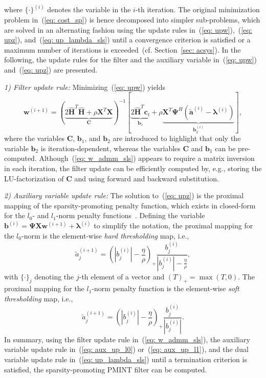 \documentclass{article}
\begin{document}
where $\{\cdot\}^{(i)}$ denotes the variable in the $i$-th iteration.
The original minimization problem in~(\ref{eq: cost_sp}) is hence decomposed into simpler sub-problems, which are solved in an alternating fashion using the update rules in~(\ref{eq: upw}),~(\ref{eq: upz}), and~(\ref{eq: up_lambda_sls}) until a convergence criterion is satisfied or a maximum number of iterations is exceeded~(cf. Section~\ref{sec: acsys}).
In the following, the update rules for the filter and the auxiliary variable in~(\ref{eq: upw}) and~(\ref{eq: upz}) are presented.

{\textit{1) Filter update rule:}} \enspace Minimizing~(\ref{eq: upw}) yields
{\small{\begin{equation}
\label{eq: w_admm_sls}
\!\mathbf{w}^{(i+1)} \!\!=\!\! (\underbrace{2 \hat{\mathbf{H}}^T\hat{\mathbf{H}} \!+\! \rho \mathbf{X}^T \mathbf{X}}_{\mathbf{C}})^{-1} [\underbrace{2 \hat{\mathbf{H}}^T \!\!\mathbf{c}_t}_{\mathbf{b}^{}_1} + \rho \underbrace{\mathbf{X}^T \mathbf{\Psi}^H \!(\tilde{\mathbf{a}}^{(i)} \!\!-\!\! \boldsymbol{\lambda}^{(i)})}_{\mathbf{b}_2^{(i)}}],\!\!\!\!
\end{equation}}}%
where the variables $\mathbf{C}$, $\mathbf{b}_1$, and $\mathbf{b}_2$ are introduced to highlight that only the variable $\mathbf{b}_2$ is iteration-dependent, whereas the variables $\mathbf{C}$ and $\mathbf{b}_1$ can be pre-computed.
Although~(\ref{eq: w_admm_sls}) appears to require a matrix inversion in each iteration, the filter update can be efficiently computed by, e.g., storing the LU-factorization of $\mathbf{C}$ and using forward and backward substitution.

{\textit{2) Auxiliary variable update rule:}} \enspace The solution to~(\ref{eq: upz}) is the proximal mapping of the sparsity-promoting penalty function, which exists in closed-form for the $l_0$- and $l_1$-norm penalty functions~\cite{Chartrand_ICASSP_2014,parikh2014proximal}.
Defining the variable $\mathbf{b}^{(i)}= \mathbf{\Psi}\mathbf{X}\mathbf{w}^{(i+1)} + \boldsymbol{\lambda}^{(i)}$ to simplify the notation, the proximal mapping for the $l_0$-norm is the element-wise {\textit{hard thresholding}} map, i.e.,
    \begin{equation}
      \label{eq: aux_up_l0}
      \tilde{a}_j^{(i+1)} =  \left(|b_j^{(i)}| - \frac{\eta}{\rho} \right)_+ \frac{b_j^{(i)}}{|b_j^{(i)}| - \frac{\eta}{\rho}},
    \end{equation}
    with $\{ \cdot \}_j$ denoting the $j$-th element of a vector and $\left(T \right)_{+} = \max (T,0)$.
    The proximal mapping for the $l_1$-norm penalty function is the element-wise {\textit{soft thresholding}} map, i.e.,
    \begin{equation}
      \label{eq: aux_up_l1}
      \tilde{a}_j^{(i+1)} = \left( |b_j^{(i)}| - \frac{\eta}{\rho} \right)_+\frac{b_j^{(i)}}{|b_j^{(i)}|}.
    \end{equation}
In summary, using the filter update rule in~(\ref{eq: w_admm_sls}), the auxiliary variable update rule in~(\ref{eq: aux_up_l0}) or~(\ref{eq: aux_up_l1}), and the dual variable update rule in~(\ref{eq: up_lambda_sls}) until a termination criterion is satisfied, the sparsity-promoting PMINT filter can be computed.
\end{document}
